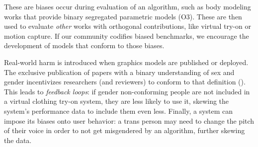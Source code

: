 \documentclass[nonacm,sigconf,review,balance=false]{acmart}
\begin{document}

 These are biases occur during evaluation of an algorithm, such as body modeling works that provide binary segregated parametric models (O3). These are then used to evaluate \emph{other} works with orthogonal contributions, like virtual try-on or motion capture. If our community codifies biased benchmarks, we encourage the development of models that conform to those biases.




 Real-world harm is introduced when graphics models are published or deployed. The exclusive publication of papers with a binary understanding of sex and gender incentivizes researchers (and reviewers) to conform to that definition (\binary).
This leads to \emph{feedback loops}: if gender non-conforming people are not included in a virtual clothing try-on system, they are less likely to use it, skewing the system's performance data to include them even less. Finally, a system can impose its biases onto user behavior: a trans person may need to change the pitch of their voice in order to not get misgendered by an algorithm, further skewing the data.

\vspace{-0.1cm}
\end{document}
